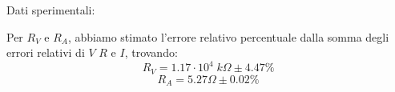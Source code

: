     
%
% 
%
    Dati sperimentali:
     
    
    
    
    Per $R_V$ e $R_A$, abbiamo stimato l'errore relativo percentuale dalla somma degli errori relativi di $V$ $R$ e $I$, trovando:
        $$ R_V = 1.17\cdot10^4 \; k\Omega \pm 4.47\%$$
        $$ R_A = 5.27 \Omega \pm 0.02 \% $$
% 
%
%
%
%

